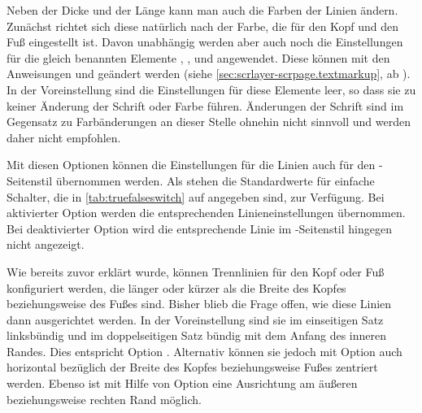 \BeginIndexGroup
{}%
%
%
%
Neben der Dicke und der Länge kann man auch die Farben der Linien
ändern. Zunächst richtet sich diese natürlich nach der Farbe, die für den Kopf
und den Fuß eingestellt ist. Davon unabhängig werden aber auch noch die
Einstellungen für die gleich benannten
Elemente ,
,  und
 angewendet. Diese können mit den Anweisungen
 und
 geändert werden (siehe
\autoref{sec:scrlayer-scrpage.textmarkup}, ab
). In der Voreinstellung sind die
Einstellungen für diese Elemente leer, so dass sie zu keiner Änderung der
Schrift oder Farbe führen. Änderungen der Schrift sind im Gegensatz zu
Farbänderungen an dieser Stelle ohnehin nicht sinnvoll und werden daher nicht
empfohlen.%
\EndIndexGroup
%
\EndIndexGroup


\begin{Declaration}
\end{Declaration}
Mit diesen Optionen können die Einstellungen für die Linien auch für den
-Seitenstil übernommen werden. Als 
stehen die Standardwerte für einfache Schalter, die in
\autoref{tab:truefalseswitch} auf  angegeben
sind, zur Verfügung. Bei aktivierter Option werden die entsprechenden
Linieneinstellungen übernommen. Bei deaktivierter Option wird die
entsprechende Linie im -Seitenstil hingegen nicht angezeigt.
%
\EndIndexGroup


\begin{Declaration}
\end{Declaration}
Wie bereits zuvor erklärt wurde, können Trennlinien für den Kopf oder Fuß
konfiguriert werden, die länger oder kürzer als die Breite des Kopfes
beziehungsweise des Fußes sind. Bisher blieb die Frage offen, wie diese Linien
dann ausgerichtet werden. In der Voreinstellung sind sie im einseitigen Satz
linksbündig und im doppelseitigen Satz bündig mit dem Anfang des inneren
Randes. Dies entspricht Option . Alternativ können sie jedoch
mit Option  auch horizontal bezüglich der Breite des Kopfes
beziehungsweise Fußes zentriert werden. Ebenso ist mit Hilfe von Option
 eine Ausrichtung am äußeren beziehungsweise rechten Rand
möglich.%
\EndIndexGroup
%
\EndIndexGroup




